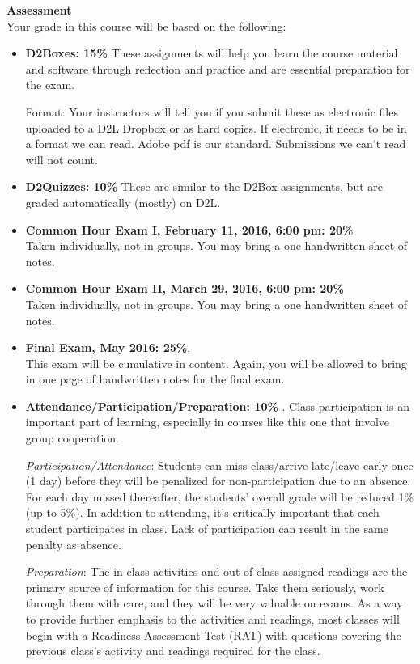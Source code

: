 {\bf Assessment}\\
Your grade in this course will be based on the following: 
\begin{itemize}
\item  {\bf D2Boxes: 15\%}  These assignments  will help you learn
  the course material and software through 
  reflection and practice and are essential preparation for the exam. 

  Format: Your instructors will tell you if you submit these as
  electronic files uploaded to a D2L Dropbox or as hard copies. If electronic,
  it needs to be in a format we can read.  Adobe pdf is our standard.
  Submissions we can't read will not count.

\item {\bf D2Quizzes:  10\%} These are similar to the D2Box
  assignments, but are graded automatically (mostly) on D2L.

\item {\bf Common Hour Exam I, February 11, 2016, 6:00 pm: \hfill 20\%}\\  
  Taken individually, not in groups. You may bring a one handwritten
  sheet of notes.  

\item {\bf Common Hour Exam II, March 29, 2016, 6:00 pm: \hfill    20\%}\\
  Taken individually, not in groups. You may bring a one handwritten sheet
  of notes. 

\item {\bf Final Exam, May  2016: \hfill 25\%}.\\
  This exam will be cumulative in content. Again, you will be allowed
  to bring in one page of handwritten notes for the final exam.   
 
\item {\bf Attendance/Participation/Preparation:  10\%} . Class
  participation is an important part of learning, especially in
  courses like this one that involve group cooperation.    

  {\it Participation/Attendance}: Students can miss class/arrive
  late/leave early once (1 day) before they will be penalized for
  non-participation due to an absence.  For each day missed
  thereafter, the students’ overall grade will be reduced 1\% (up to
  5\%).   In addition to attending, it's critically important that
  each student participates in class. Lack of participation can result
  in the same penalty as absence.

  {\it Preparation}: The in-class activities and out-of-class assigned
  readings are the primary source of  information for this course.
  Take them seriously, work through them with care, and they will be
  very valuable on exams.  As a way to provide further emphasis to the
  activities and readings, most classes will begin with a Readiness
  Assessment Test (RAT) with questions covering the previous class's
  activity and readings required for the class.   
\end{itemize}

